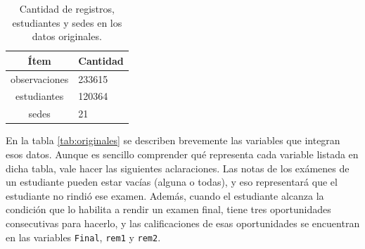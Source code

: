 \documentclass[a4paper,11pt,dvipsnames]{article}
\begin{document}
\begin{table}[!hb]
    \caption{Cantidad de registros, estudiantes y sedes en los datos originales.}
    \begin{center}
    \begin{tabular}{cl}
    \hline
    \textbf{Ítem} & \textbf{Cantidad}\\
    \hline
    observaciones & 233615\\
    estudiantes & 120364\\
    sedes & 21\\
    \hline
    \end{tabular}
    \label{tab:tamanio}
    \end{center}
\end{table}

En la tabla \ref{tab:originales} se describen brevemente las variables que integran esos datos. Aunque es sencillo comprender qué representa cada variable listada en dicha tabla, vale hacer las siguientes aclaraciones. Las notas de los exámenes de un estudiante pueden estar vacías (alguna o todas), y eso representará que el estudiante no rindió ese examen. Además, cuando el estudiante alcanza la condición que lo habilita a rendir un examen final, tiene tres oportunidades consecutivas para hacerlo, y las calificaciones de esas oportunidades se encuentran en las variables \texttt{Final}, \texttt{rem1} y \texttt{rem2}.\par\medskip
\end{document}
